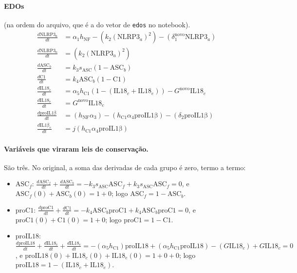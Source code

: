 \documentclass[11pt]{article}
\begin{document}
\paragraph{EDOs} (na ordem do arquivo, que é a do vetor de \texttt{edos} no notebook).
\begin{align}
\frac{d\mathrm{NLRP3}_a}{dt} &= \alpha_1 h_{\mathrm{NF}} - (k_2 (\mathrm{NLRP3}_a)^2) - (\delta_1^{\mathrm{novo}} \mathrm{NLRP3}_a) \\
\frac{d\mathrm{NLRP3}_o}{dt} &= (k_2 (\mathrm{NLRP3}_a)^2) \\
\frac{d\mathrm{ASC}_b}{dt}   &= k_3 s_{\mathrm{ASC}} (1 - \mathrm{ASC}_b) \\
\frac{d\mathrm{C1}}{dt}      &= k_4 \mathrm{ASC}_b (1 - \mathrm{C1}) \\
\frac{d\mathrm{IL18}_c}{dt}  &= \alpha_5 h_{\mathrm{C1}} (1 - (\mathrm{IL18}_c + \mathrm{IL18}_e)) - G^{\mathrm{novo}} \mathrm{IL18}_c \\
\frac{d\mathrm{IL18}_e}{dt}  &= G^{\mathrm{novo}} \mathrm{IL18}_c \\
\frac{d\mathrm{proIL1\beta}}{dt} &= (h_{\mathrm{NF}} \alpha_3) - (h_{\mathrm{C1}} \alpha_4 \mathrm{proIL1\beta}) - (\delta_2 \mathrm{proIL1\beta}) \\
\frac{d\mathrm{IL1\beta}_e}{dt}  &= j (h_{\mathrm{C1}} \alpha_4 \mathrm{proIL1\beta})
\end{align}

\paragraph{Variáveis que viraram leis de conservação.} São três. No original, a soma das
derivadas de cada grupo é zero, termo a termo:
\begin{itemize}
\item $\mathrm{ASC}_f$: $\frac{d\mathrm{ASC}_f}{dt} + \frac{d\mathrm{ASC}_b}{dt}
  = -k_3 s_{\mathrm{ASC}} \mathrm{ASC}_f + k_3 s_{\mathrm{ASC}} \mathrm{ASC}_f = 0$, e
  $\mathrm{ASC}_f(0) + \mathrm{ASC}_b(0) = 1 + 0$; logo $\mathrm{ASC}_f = 1 - \mathrm{ASC}_b$.
\item $\mathrm{proC1}$: $\frac{d\mathrm{proC1}}{dt} + \frac{d\mathrm{C1}}{dt}
  = -k_4 \mathrm{ASC}_b \mathrm{proC1} + k_4 \mathrm{ASC}_b \mathrm{proC1} = 0$, e
  $\mathrm{proC1}(0) + \mathrm{C1}(0) = 1 + 0$; logo $\mathrm{proC1} = 1 - \mathrm{C1}$.
\item $\mathrm{proIL18}$: $\frac{d\mathrm{proIL18}}{dt} + \frac{d\mathrm{IL18}_c}{dt} +
  \frac{d\mathrm{IL18}_e}{dt} = -(\alpha_5 h_{\mathrm{C1}}) \mathrm{proIL18} +
  (\alpha_5 h_{\mathrm{C1}} \mathrm{proIL18}) - (G \mathrm{IL18}_c) + G \mathrm{IL18}_c = 0$, e
  $\mathrm{proIL18}(0) + \mathrm{IL18}_c(0) + \mathrm{IL18}_e(0) = 1 + 0 + 0$; logo
  $\mathrm{proIL18} = 1 - (\mathrm{IL18}_c + \mathrm{IL18}_e)$.
\end{itemize}
\end{document}
